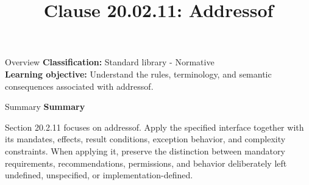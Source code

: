 \documentclass[10pt,letterpaper]{article}
\title{Clause 20.02.11: Addressof}
\author{}
\date{}
\begin{document}
\maketitle
\begin{CornellOverviewBox}{Overview}
\textbf{Classification:} Standard library - Normative\\[2pt]
\textbf{Learning objective:} Understand the rules, terminology, and semantic consequences associated with addressof.
\end{CornellOverviewBox}\begin{CornellSummaryBox}{Summary}
{\sffamily\bfseries\color{Accent} Summary}\par\vspace{3pt}Section 20.2.11 focuses on addressof. Apply the specified interface together with its mandates, effects, result conditions, exception behavior, and complexity constraints. When applying it, preserve the distinction between mandatory requirements, recommendations, permissions, and behavior deliberately left undefined, unspecified, or implementation-defined.
\end{CornellSummaryBox}
\end{document}
